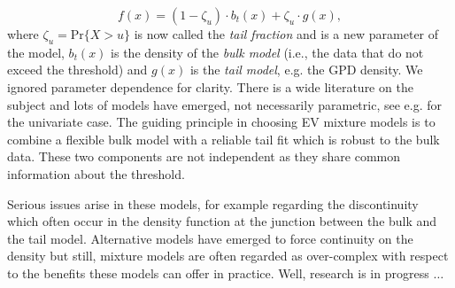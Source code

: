 \begin{equation}
f(x)=(1-\zeta_u)\cdot b_t(x)+\zeta_u\cdot g(x),
\end{equation}
where $\zeta_u=\text{Pr}\big\{X>u\big\}$ is now called the \emph{tail fraction} and is a new parameter of the model, $b_t(x)$ is the density of the \textit{bulk model} (i.e., the data that do not exceed the threshold) and $g(x)$ is the \emph{tail model}, e.g. the GPD density. We ignored parameter dependence for clarity. There is a wide literature on the subject and lots of models have emerged, not necessarily parametric, see e.g. \citet[chap.3]{dey_extreme_2016} for the univariate case.
The guiding principle in choosing EV mixture models is to combine a flexible bulk model with a reliable tail fit which is robust to the bulk data. These two components are not independent as they share common information about the threshold.

Serious issues arise in these models, for example regarding the discontinuity which often occur in the density function at the junction between the bulk and the tail model. Alternative models have emerged to force continuity on the density but still, mixture models are often regarded as over-complex with respect to the benefits these models can offer in practice. Well, research is in progress $\ldots$

